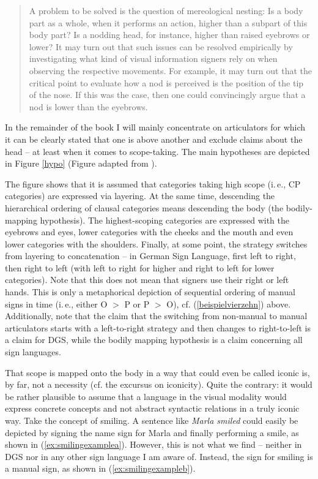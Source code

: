 \begin{quote}
A problem to be solved is the question of mereological nesting: Is a body part as a whole, when it performs an action, higher than a subpart of this body part? Is a nodding head, for instance, higher than raised eyebrows or lower? It may turn out that such issues can be resolved empirically by investigating what kind of visual information signers rely on when observing the respective movements. For example, it may turn out that the critical point to evaluate how a nod is perceived is the position of the tip of the nose. If this was the case, then one could convincingly argue that a nod is lower than the eyebrows. \citep[24]{bross2017scope}
\end{quote}

\noindent In the remainder of the book I will mainly concentrate on articulators for which it can be clearly stated that one is above another and exclude claims about the head -- at least when it comes to scope-taking. The main hypotheses are depicted in Figure \ref{hypo} (Figure adapted from \citealt[25]{bross2017scope}).

The figure shows that it is assumed that categories taking high scope (i.\,e., CP categories) are expressed via layering. At the same time, descending the hierarchical ordering of clausal categories means descending the body (the bodily-mapping hypothesis). The highest-scoping categories are expressed with the eyebrows and eyes, lower categories with the cheeks and the mouth and even lower categories with the shoulders. Finally, at some point, the strategy switches from layering to concatenation -- in German Sign Language, first left to right, then right to left (with left to right for higher and right to left for lower categories). Note that this does not mean that signers use their right or left hands. This is only a metaphorical depiction of sequential ordering of manual signs in time (i.\,e., either O $>$ P or P $>$ O), cf. (\ref{beispielvierzehn}) above. Additionally, note that the claim that the switching from non-manual to manual articulators starts with a left-to-right strategy and then changes to right-to-left is a claim for DGS, while the bodily mapping hypothesis is a claim concerning all sign languages. 

That scope is mapped onto the body in a way that could even be called iconic is, by far, not a necessity (cf. the excursus on iconicity). Quite the contrary: it would be rather plausible to assume that a language in the visual modality would express concrete concepts and not abstract syntactic relations in a truly iconic way. Take the concept of smiling. A sentence like \textit{Marla smiled} could easily be depicted by signing the name sign for Marla and finally performing a smile, as shown in (\ref{ex:smilingexamplea}). However, this is not what we find -- neither in DGS nor in any other sign language I am aware of. Instead, the sign for smiling is a manual sign, as shown in (\ref{ex:smilingexampleb}).

